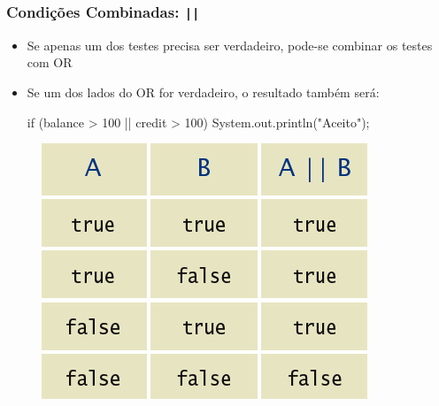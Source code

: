 \documentclass[xcolor={dvipsnames,table},aspectratio=169]{beamer}
\begin{document}
\begin{frame}[fragile]\frametitle{Condições Combinadas: \texttt{||}}
\begin{itemize}
	\item Se apenas um dos testes precisa ser verdadeiro, pode-se combinar os testes com OR
	\item Se um dos lados do OR for verdadeiro, o resultado também será:
{\scriptsize
\begin{javacode}
if (balance > 100 || credit > 100) {
  System.out.println("Aceito"); 
}
\end{javacode}
}
\end{itemize}
\begin{figure}[h]
	\includegraphics[height=0.35\paperheight,center]{pucrs-ep-fprog-unidade_03-decisoes-laminas-or.png}
\end{figure}
\end{frame}
\end{document}
